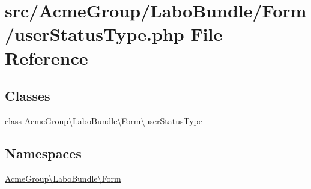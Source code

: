 \hypertarget{user_status_type_8php}{\section{src/\+Acme\+Group/\+Labo\+Bundle/\+Form/user\+Status\+Type.php File Reference}
\label{user_status_type_8php}
}
\subsection*{Classes}
\begin{DoxyCompactItemize}
\item 
class \hyperlink{class_acme_group_1_1_labo_bundle_1_1_form_1_1user_status_type}{Acme\+Group\textbackslash{}\+Labo\+Bundle\textbackslash{}\+Form\textbackslash{}user\+Status\+Type}
\end{DoxyCompactItemize}
\subsection*{Namespaces}
\begin{DoxyCompactItemize}
\item 
 \hyperlink{namespace_acme_group_1_1_labo_bundle_1_1_form}{Acme\+Group\textbackslash{}\+Labo\+Bundle\textbackslash{}\+Form}
\end{DoxyCompactItemize}
